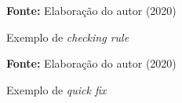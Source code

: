 \begin{figure}[ht!]
\centering

\caption{\textmd{Exemplo de \textit{checking rule}}}
\label{fig:checkingrule}

\par\medskip\textbf{Fonte:} Elaboração do autor (2020) \par\medskip

\end{figure}


\begin{figure}[ht!]
\centering

\caption{\textmd{Exemplo de \textit{quick fix}}}
\label{fig:quickfix}

\par\medskip\textbf{Fonte:} Elaboração do autor (2020) \par\medskip

\end{figure}

